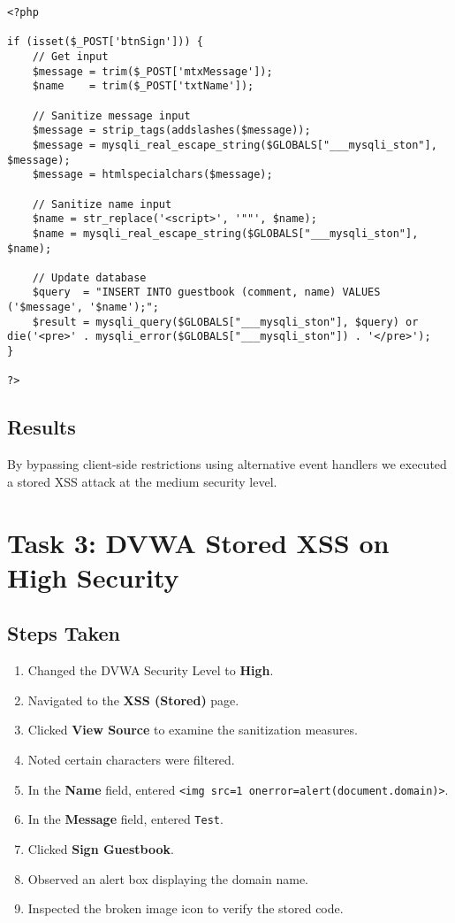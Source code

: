 \documentclass[12pt]{article}
\begin{document}
\begin{lstlisting}[style=terminal]
<?php

if (isset($_POST['btnSign'])) {
    // Get input
    $message = trim($_POST['mtxMessage']);
    $name    = trim($_POST['txtName']);

    // Sanitize message input
    $message = strip_tags(addslashes($message));
    $message = mysqli_real_escape_string($GLOBALS["___mysqli_ston"], $message);
    $message = htmlspecialchars($message);

    // Sanitize name input
    $name = str_replace('<script>', '""', $name);
    $name = mysqli_real_escape_string($GLOBALS["___mysqli_ston"], $name);

    // Update database
    $query  = "INSERT INTO guestbook (comment, name) VALUES ('$message', '$name');";
    $result = mysqli_query($GLOBALS["___mysqli_ston"], $query) or die('<pre>' . mysqli_error($GLOBALS["___mysqli_ston"]) . '</pre>');
}

?>
\end{lstlisting}

\subsection{Results}

By bypassing client-side restrictions using alternative event handlers we executed a stored XSS attack at the medium security level.

\section{Task 3: DVWA Stored XSS on High Security}

\subsection{Steps Taken}

\begin{enumerate}
    \item Changed the DVWA Security Level to \textbf{High}.
    \item Navigated to the \textbf{XSS (Stored)} page.
    \item Clicked \textbf{View Source} to examine the sanitization measures.
    \item Noted certain characters were filtered.
    \item In the \textbf{Name} field, entered \texttt{<img src=1 onerror=alert(document.domain)>}.
    \item In the \textbf{Message} field, entered \texttt{Test}.
    \item Clicked \textbf{Sign Guestbook}.
    \item Observed an alert box displaying the domain name.
    \item Inspected the broken image icon to verify the stored code.
\end{enumerate}
\end{document}
